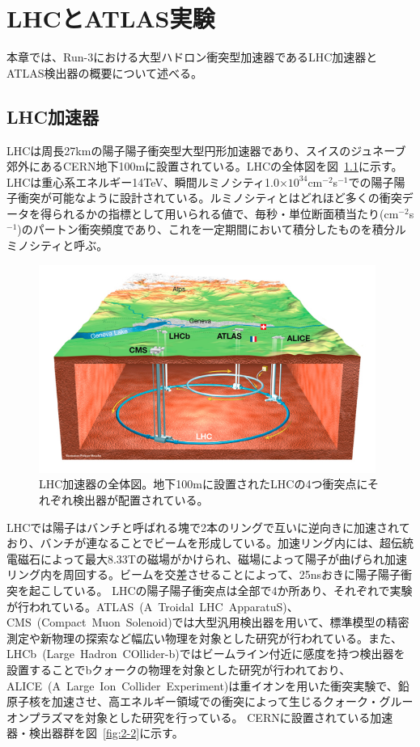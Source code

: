 \chapter{LHCとATLAS実験}\label{chapter2}
本章では、Run-3における大型ハドロン衝突型加速器であるLHC加速器とATLAS検出器の概要について述べる。


\section{LHC加速器}\label{section2-1}
LHCは周長27kmの陽子陽子衝突型大型円形加速器であり、スイスのジュネーブ郊外にあるCERN地下100mに設置されている。LHCの全体図を図~\ref{fig:2-1}に示す。LHCは重心系エネルギー14TeV、瞬間ルミノシティ1.0$\times10^{34}$cm$^{-2}$s$^{-1}$での陽子陽子衝突が可能なように設計されている。ルミノシティとはどれほど多くの衝突データを得られるかの指標として用いられる値で、毎秒・単位断面積当たり(cm$^{-2}$s$^{-1}$)のパートン衝突頻度であり、これを一定期間において積分したものを積分ルミノシティと呼ぶ。

\begin{figure}[h]
  \centering
  \includegraphics[clip, width=11cm]{fig/2/lhc_map.jpg}
  \caption{LHC加速器の全体図\cite{article:Overall_view_LHC}。地下100mに設置されたLHCの4つ衝突点にそれぞれ検出器が配置されている。}
  \label{fig:2-1}
\end{figure}

LHCでは陽子はバンチと呼ばれる塊で2本のリングで互いに逆向きに加速されており、バンチが連なることでビームを形成している。加速リング内には、超伝統電磁石によって最大8.33Tの磁場がかけられ、磁場によって陽子が曲げられ加速リング内を周回する。ビームを交差させることによって、25nsおきに陽子陽子衝突を起こしている。
LHCの陽子陽子衝突点は全部で4か所あり、それぞれで実験が行われている。ATLAS~(A~Troidal~LHC~ApparatuS)、CMS~(Compact~Muon~Solenoid)\cite{article:CMSExperiment}では大型汎用検出器を用いて、標準模型の精密測定や新物理の探索など幅広い物理を対象とした研究が行われている。また、LHCb~(Large~Hadron~COllider-b)\cite{article:LHCbExperiment}ではビームライン付近に感度を持つ検出器を設置することでbクォークの物理を対象とした研究が行われており、ALICE~(A~Large~Ion~Collider~Experiment)\cite{article:ALICEExperiment}は重イオンを用いた衝突実験で、鉛原子核を加速させ、高エネルギー領域での衝突によって生じるクォーク・グルーオンプラズマを対象とした研究を行っている。
CERNに設置されている加速器・検出器群を図~\ref{fig:2-2}に示す。

